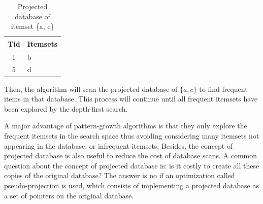 \begin{table}
    \centering
    \caption{Projected database of itemset \{a, c\}}
    \label{tab:projected_database_a_c}
    \begin{tabular}{|c|l|}
        \hline
        \textbf{Tid} & \textbf{Itemsets} \\
        \hline
        1            & b                 \\
        5            & d                 \\
        \hline
    \end{tabular}
\end{table}

Then, the algorithm will scan the projected database of $\{a, c\}$ to find frequent items in that database. This process will
continue until all frequent itemsets have been explored by the depth-first search.

A major advantage of pattern-growth algorithms is that they only explore the frequent
itemsets in the search space thus avoiding considering many itemsets not appearing in the
database, or infrequent itemsets. Besides, the concept of projected database is also useful
to reduce the cost of database scans. A common question about the concept of projected
database is: is it costly to create all these copies of the original database? The answer is no if
an optimization called pseudo-projection is used, which consists of implementing a projected
database as a set of pointers on the original database.